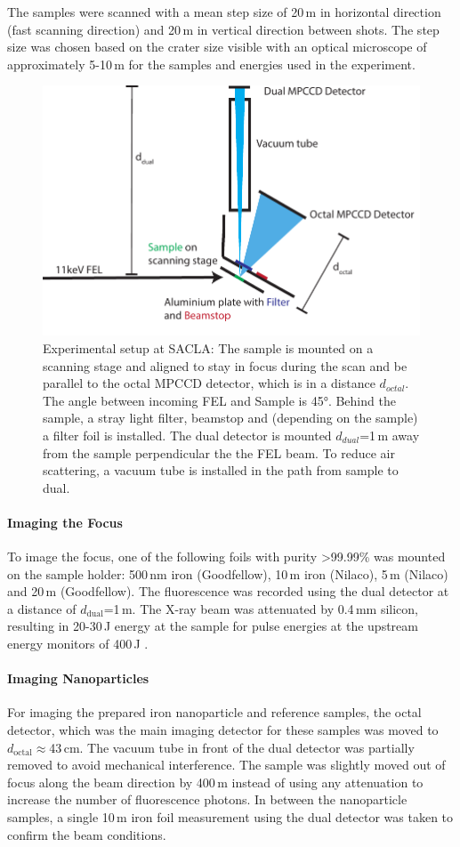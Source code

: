 The samples were scanned with a mean step size of 20\,\textmu m in horizontal direction (fast scanning direction) and 20\,\textmu m in vertical direction between shots. The step size was chosen based on the crater size visible with an optical microscope of approximately 5-10\,\textmu m for the samples and energies used in the experiment.

\begin{figure}
	\centering
	\includegraphics[width=0.75\linewidth]{images/setup.pdf}
	\caption[Experimental setup at SACLA]{Experimental setup at SACLA: The sample is mounted on a scanning stage and aligned to stay in focus during the scan and be parallel to the octal MPCCD detector, which is in a distance $d_{octal}$. The angle between incoming FEL and Sample is 45°. Behind the sample, a stray light filter, beamstop and (depending on the sample) a filter foil is installed. The dual detector is mounted $d_{dual}$=1\,m away from the sample perpendicular the the FEL beam. To reduce air scattering, a vacuum tube is installed in the path from sample to dual.}
	\label{fig:setup}
\end{figure}
\paragraph{Imaging the Focus}
To image the focus, one of the following foils with purity >99.99\% was mounted on the sample holder: 500\,nm iron (Goodfellow), 10\,\textmu m iron (Nilaco), 5\,\textmu m (Nilaco) and 20\,\textmu m (Goodfellow). The fluorescence was recorded using the dual detector at a distance of $d_\text{dual}$=1\,m.
The X-ray beam was attenuated by 0.4\,mm silicon, resulting in 20-30\,\textmu J  energy at the sample for pulse energies at the upstream energy monitors of 400\,\textmu J \cite{yabashi2015,tono2013}.
\paragraph{Imaging Nanoparticles}
For imaging the prepared iron nanoparticle and reference samples, the octal detector, which was the main imaging detector for these samples was moved to $d_\text{octal}\approx$43\,cm. The vacuum tube in front of the dual detector was partially removed to avoid mechanical interference. The sample was slightly moved out of focus along the beam direction by 400\,\textmu m instead of using any attenuation to increase the number of fluorescence photons. In between the nanoparticle samples, a single 10\,\textmu m iron foil measurement using the dual detector was taken to confirm the beam conditions.

